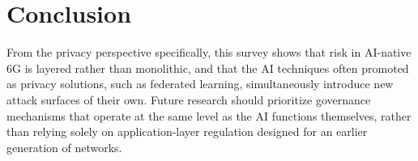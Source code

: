 \documentclass[letterpaper]{article}
\begin{document}
\section{Conclusion}
From the privacy perspective specifically, this survey shows that risk in AI-native 6G
is layered rather than monolithic, and that the AI techniques often promoted as privacy
solutions, such as federated learning, simultaneously introduce new attack surfaces of
their own. Future research should prioritize governance mechanisms that operate at the
same level as the AI functions themselves, rather than relying solely on
application-layer regulation designed for an earlier generation of networks.



\end{document}
